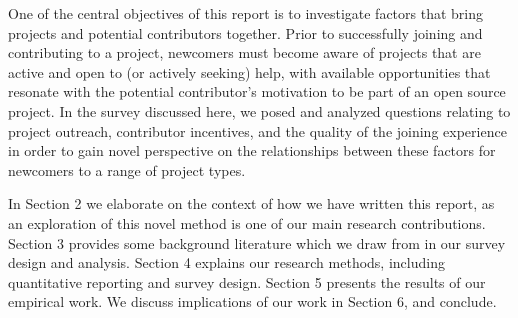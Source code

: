 One of the central objectives of this report is to investigate factors that bring projects and potential contributors together. Prior to successfully joining and contributing to a project, newcomers must become aware of projects that are active and open to (or actively seeking) help, with available opportunities that resonate with the potential contributor's motivation to be part of an open source project. In the survey discussed here, we posed and analyzed questions relating to project outreach, contributor incentives, and the quality of the joining experience in order to gain novel perspective on the relationships between these factors for newcomers to a range of project types.



In Section 2 we elaborate on the context of how we have written this report, as an exploration of this novel method is one of our main research contributions.
Section 3 provides some background literature which we draw from in
our survey design and analysis.
Section 4 explains our research methods, including quantitative
reporting and survey design.
Section 5 presents the results of our empirical work.
We discuss implications of our work in Section 6, and conclude. 


